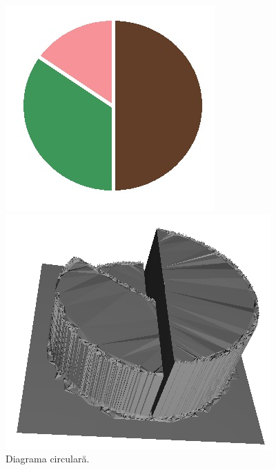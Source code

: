 \documentclass[12pt]{article}
\begin{document}
\begin{figure}[!htb]
	\begin{minipage}{0.24\textwidth}
		\centering
		\includegraphics[width=.95\linewidth]{Diagrama/DiagramaImg.jpg}
		\caption{Diagrama circulară.}\label{fig:fig8}
	\end{minipage}\hfill
	\begin{minipage}{0.24\textwidth}
		\centering
		\includegraphics[width=.95\linewidth]{Diagrama/DiagramaMesh.png}

\end{minipage}
\end{figure}
\end{document}
